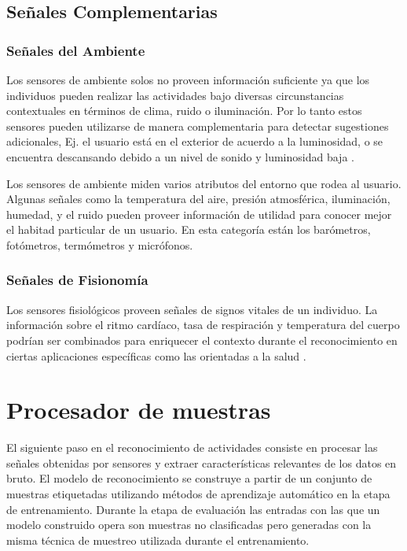 \subsection{Señales Complementarias}

\subsubsection{Señales del Ambiente}

Los sensores de ambiente solos no proveen información suficiente ya
que los individuos pueden realizar las actividades bajo diversas circunstancias
contextuales en términos de clima, ruido o iluminación. Por lo tanto
estos sensores pueden utilizarse de manera complementaria para detectar
sugestiones adicionales, Ej. el usuario está en el exterior de acuerdo
a la luminosidad, o se encuentra descansando debido a un nivel de
sonido y luminosidad baja \cite{LaraLabrador2013}.

Los sensores de ambiente miden varios atributos del entorno que rodea
al usuario. Algunas señales como la temperatura del aire, presión
atmosférica, iluminación, humedad, y el ruido pueden proveer información
de utilidad para conocer mejor el habitad particular de un usuario.
En esta categoría están los barómetros, fotómetros, termómetros y
micrófonos.

\subsubsection{Señales de Fisionomía}

Los sensores fisiológicos proveen señales de signos vitales de un
individuo. La información sobre el ritmo cardíaco, tasa de respiración
y temperatura del cuerpo podrían ser combinados para enriquecer el
contexto durante el reconocimiento en ciertas aplicaciones específicas
como las orientadas a la salud \cite{LaraLabrador2013}.

\section{Procesador de muestras}

\label{sec44:proceso-se=0000F1ales}El siguiente paso en el reconocimiento
de actividades consiste en procesar las señales obtenidas por sensores
y extraer características relevantes de los datos en bruto. El modelo
de reconocimiento se construye a partir de un conjunto de muestras
etiquetadas utilizando métodos de aprendizaje automático en la etapa
de entrenamiento. Durante la etapa de evaluación las entradas con
las que un modelo construido opera son muestras no clasificadas pero
generadas con la misma técnica de muestreo utilizada durante el entrenamiento.

